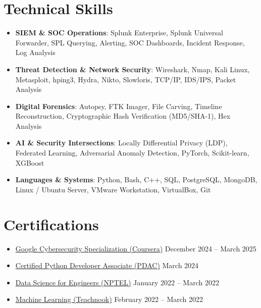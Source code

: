 \documentclass[letterpaper,10pt]{article}
\newcommand{\resumeItem}[1]{\item\small{#1}}
\newcommand{\resumeSubHeadingList}{\begin{itemize}[leftmargin=0.15in, label={}]}
\newcommand{\resumeSubHeadingListEnd}{\end{itemize}}
\begin{document}
\section{Technical Skills}
\resumeSubHeadingList
  \resumeItem{\textbf{SIEM \& SOC Operations}: Splunk Enterprise, Splunk Universal Forwarder, SPL Querying, Alerting, SOC Dashboards, Incident Response, Log Analysis}
  \resumeItem{\textbf{Threat Detection \& Network Security}: Wireshark, Nmap, Kali Linux, Metasploit, hping3, Hydra, Nikto, Slowloris, TCP/IP, IDS/IPS, Packet Analysis}
  \resumeItem{\textbf{Digital Forensics}: Autopsy, FTK Imager, File Carving, Timeline Reconstruction, Cryptographic Hash Verification (MD5/SHA-1), Hex Analysis}
  \resumeItem{\textbf{AI \& Security Intersections}: Locally Differential Privacy (LDP), Federated Learning, Adversarial Anomaly Detection, PyTorch, Scikit-learn, XGBoost}
  \resumeItem{\textbf{Languages \& Systems}: Python, Bash, C++, SQL, PostgreSQL, MongoDB, Linux / Ubuntu Server, VMware Workstation, VirtualBox, Git}
\resumeSubHeadingListEnd

\section{Certifications}
\resumeSubHeadingList
  \resumeItem{\href{https://www.coursera.org/account/accomplishments/specialization/QQOKJ9WNIWB9}{Google Cybersecurity Specialization (Coursera)} \hfill December 2024 -- March 2025}
  \resumeItem{\href{https://drive.google.com/file/d/1ofpmj-bLuC3EHXQGxpZV1dIxlXbkgEd6/view?usp=sharing}{Certified Python Developer Associate (PDAC)} \hfill March 2024}
  \resumeItem{\href{https://drive.google.com/file/d/1G3WGzaN9tsonASGrbLfKoXXj_7vUHSiA/view?usp=sharing}{Data Science for Engineers (NPTEL)} \hfill January 2022 -- March 2022}
  \resumeItem{\href{https://drive.google.com/file/d/19hY_be_Ezg3w1nLbYdGw9-6Z1nsBYbDd/view?usp=sharing}{Machine Learning (Teachnook)} \hfill February 2022 -- March 2022}
\resumeSubHeadingListEnd
\end{document}
